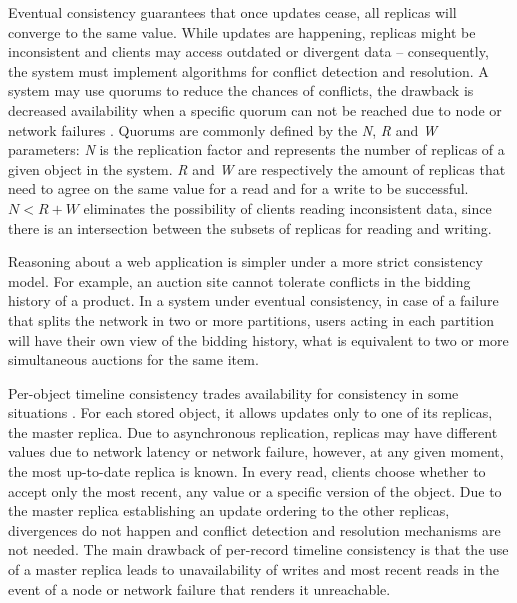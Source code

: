 \documentclass[doublespacing]{bmcart}
\begin{document}
Eventual consistency guarantees that once updates cease, all replicas will
converge to the same value. While updates are happening, replicas might be
inconsistent and clients may access outdated or divergent data -- consequently,
the system must implement algorithms for conflict detection and resolution. A
system may use quorums to reduce the chances of conflicts, the drawback is
decreased availability when a specific quorum can not be reached due to node or
network failures \cite{Vogels2009}.  Quorums are commonly defined by the
\textit{N}, \textit{R} and \textit{W} parameters: \textit{N} is the replication
factor and represents the number of replicas of a given object in the system.
\textit{R} and \textit{W} are respectively the amount of replicas that need to
agree on the same value for a read and for a write to be successful.  $N < R +
W$ eliminates the possibility of clients reading inconsistent data, since there
is an intersection between the subsets of replicas for reading and writing.

Reasoning about a web application is simpler under a more strict consistency
model. For example, an auction site cannot tolerate conflicts in the bidding
history of a product. In a system under eventual consistency, in case of a
failure that splits the network in two or more partitions, users acting in each
partition will have their own view of the bidding history, what is equivalent
to two or more simultaneous auctions for the same item.

Per-object timeline consistency trades availability for consistency in some
situations \cite{Cooper2008}. For each stored object, it allows updates only to
one of its replicas, the master replica. Due to asynchronous replication,
replicas may have different values due to network latency or network failure,
however, at any given moment, the most up-to-date replica is known. In every
read, clients choose whether to accept only the most recent, any value or a
specific version of the object. Due to the master replica establishing an
update ordering to the other replicas, divergences do not happen and conflict
detection and resolution mechanisms are not needed. The main drawback of
per-record timeline consistency is that the use of a master replica leads to
unavailability of writes and most recent reads in the event of a node or
network failure that renders it unreachable.
\end{document}
